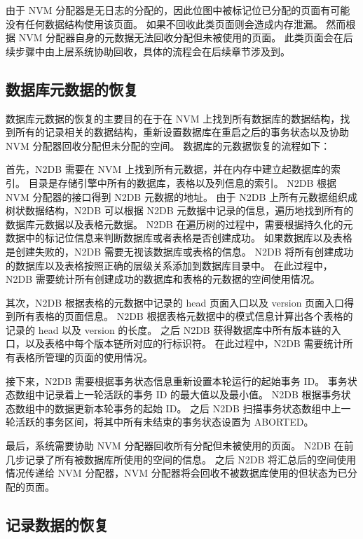 由于 NVM 分配器是无日志的分配的，因此位图中被标记位已分配的页面有可能没有任何数据结构使用该页面。
如果不回收此类页面则会造成内存泄漏。
然而根据 NVM 分配器自身的元数据无法回收分配但未被使用的页面。
此类页面会在后续步骤中由上层系统协助回收，具体的流程会在后续章节涉及到。

\subsection{数据库元数据的恢复}
\label{ssec:metadata-recovery}

数据库元数据的恢复的主要目的在于在 NVM 上找到所有数据库的数据结构，找到所有的记录相关的数据结构，重新设置数据库在重启之后的事务状态以及协助 NVM 分配器回收分配但未分配的空间。
数据库的元数据恢复的流程如下：

首先，N2DB 需要在 NVM 上找到所有元数据，并在内存中建立起数据库的索引。
目录是存储引擎中所有的数据库，表格以及列信息的索引。
N2DB 根据 NVM 分配器的接口得到 N2DB 元数据的地址。
由于 N2DB 上所有元数据组织成树状数据结构，N2DB 可以根据 N2DB 元数据中记录的信息，遍历地找到所有的数据库元数据以及表格元数据。
N2DB 在遍历树的过程中，需要根据持久化的元数据中的标记位信息来判断数据库或者表格是否创建成功。
如果数据库以及表格是创建失败的，N2DB 需要无视该数据库或表格的信息。
N2DB 将所有创建成功的数据库以及表格按照正确的层级关系添加到数据库目录中。
在此过程中，N2DB 需要统计所有创建成功的数据库和表格的元数据的空间使用情况。

其次，N2DB 根据表格的元数据中记录的 head 页面入口以及 version 页面入口得到所有表格的页面信息。
N2DB 根据表格元数据中的模式信息计算出各个表格的记录的 head 以及 version 的长度。
之后 N2DB 获得数据库中所有版本链的入口，以及表格中每个版本链所对应的行标识符。
在此过程中，N2DB 需要统计所有表格所管理的页面的使用情况。

接下来，N2DB 需要根据事务状态信息重新设置本轮运行的起始事务 ID。
事务状态数组中记录着上一轮活跃的事务 ID 的最大值以及最小值。
N2DB 根据事务状态数组中的数据更新本轮事务的起始 ID。
之后 N2DB 扫描事务状态数组中上一轮活跃的事务区间，将其中所有未结束的事务状态设置为 ABORTED。

最后，系统需要协助 NVM 分配器回收所有分配但未被使用的页面。
N2DB 在前几步记录了所有被数据库所使用的空间的信息。
之后 N2DB 将汇总后的空间使用情况传递给 NVM 分配器，NVM 分配器将会回收不被数据库使用的但状态为已分配的页面。



\subsection{记录数据的恢复}
\label{ssec:record-recovery}

